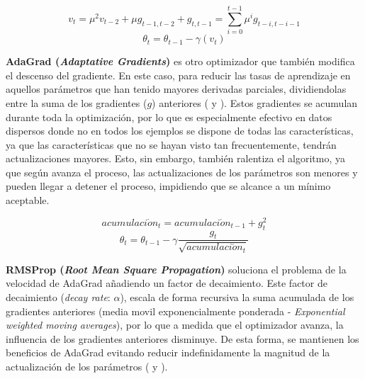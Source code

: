 \begin{equation}
\label{eqn:momento2}
v_t = \mu^2 v_{t-2} + \mu g_{t-1, t-2} + g_{t, t-1} = \sum_{i=0}^{t-1}\mu^{i}g_{t-i, t-i-1}
\end{equation}
\begin{equation}
\label{eqn:momento3}
\theta_t = \theta_{t-1} - \gamma (v_t)
\end{equation}

\textbf{AdaGrad (\textit{Adaptative Gradients})} es otro optimizador que también modifica el descenso del gradiente. En este caso, para reducir las tasas de aprendizaje en aquellos parámetros que han tenido mayores derivadas parciales, dividiendolas entre la suma de los gradientes ($g$) anteriores ( y ). Estos gradientes se acumulan durante toda la optimización, por lo que es especialmente efectivo en datos dispersos donde no en todos los ejemplos se dispone de todas las características, ya que las características que no se hayan visto tan frecuentemente, tendrán actualizaciones mayores. Esto, sin embargo, también ralentiza el algoritmo, ya que según avanza el proceso, las actualizaciones de los parámetros son menores y pueden llegar a detener el proceso, impidiendo que se alcance a un mínimo aceptable.

\begin{equation}
\label{eqn:adagrad}
acumulaci\acute{o}n_t = acumulaci\acute{o}n_{t-1} + g^{2}_{t}
\end{equation}
\begin{equation}
\label{eqn:adagrad2}
\theta_t = \theta_{t-1} - \gamma \frac{g_t}{\sqrt{acumulaci\acute{o}n_t}}
\end{equation}


\textbf{RMSProp (\textit{Root Mean Square Propagation})} soluciona el problema de la velocidad de AdaGrad añadiendo un factor de decaimiento. Este factor de decaimiento (\textit{decay rate}: $\alpha$), escala de forma recursiva la suma acumulada de los gradientes anteriores (media movil exponencialmente ponderada - \textit{Exponential weighted moving averages}), por lo que a medida que el optimizador avanza, la influencia de los gradientes anteriores disminuye. De esta forma, se mantienen los beneficios de AdaGrad evitando reducir indefinidamente la magnitud de la actualización de los parámetros ( y ).


